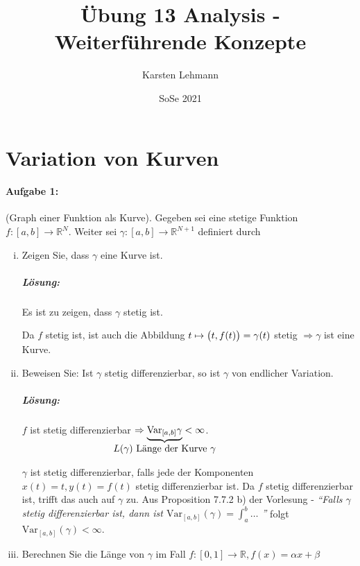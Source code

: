 \documentclass{scrreprt}
\author{Karsten Lehmann}
\date{SoSe 2021}
\title{Übung 13 Analysis - Weiterführende Konzepte}
\begin{document}
\setcounter{chapter}{1}
\section*{Variation von Kurven}
\paragraph{Aufgabe 1:} (Graph einer Funktion als Kurve).
Gegeben sei eine stetige Funktion $f \colon [a, b] \to \mathbb{R}^N$.
Weiter sei $\gamma \colon [a, b] \to \mathbb{R}^{N + 1}$ definiert durch
\begin{enumerate}[(i)]
\item Zeigen Sie, dass $\gamma$ eine Kurve ist.
  \subparagraph{Lösung:} Es ist zu zeigen, dass $\gamma$ stetig ist.

  Da $f$ stetig ist, ist auch die Abbildung
  $t \mapsto \qty\big(t, f(t)) = \gamma(t)$ stetig
  $\Rightarrow \gamma$ ist eine Kurve.

\item Beweisen Sie: Ist $\gamma$ stetig differenzierbar, so ist
  $\gamma$ von endlicher Variation.

  \subparagraph{Lösung:} $f$ ist stetig differenzierbar
  $\Rightarrow \underset{\makebox[0pt]{$L(\gamma)$ Länge der Kurve $\gamma$}}{
    \underbrace{\text{Var}_{[a, b]} \gamma}
  } < \infty$.

  $\gamma$ ist stetig differenzierbar, falls jede der Komponenten
  $x(t) = t, y(t) = f(t)$ stetig differenzierbar ist.
  Da $f$ stetig differenzierbar ist, trifft das auch auf $\gamma$
  zu.
  Aus Proposition 7.7.2 b) der Vorlesung -
  \textit{``Falls $\gamma$ stetig differenzierbar ist, dann ist
    $\text{Var}_{[a,b]}(\gamma) = \int_a^b \ldots$
  ''} folgt $\text{Var}_{[a,b]}(\gamma) < \infty$.

\item Berechnen Sie die Länge von $\gamma$ im Fall
  $f \colon [0, 1] \to \mathbb{R}, f(x) = \alpha x + \beta$


\end{enumerate}
\end{document}
